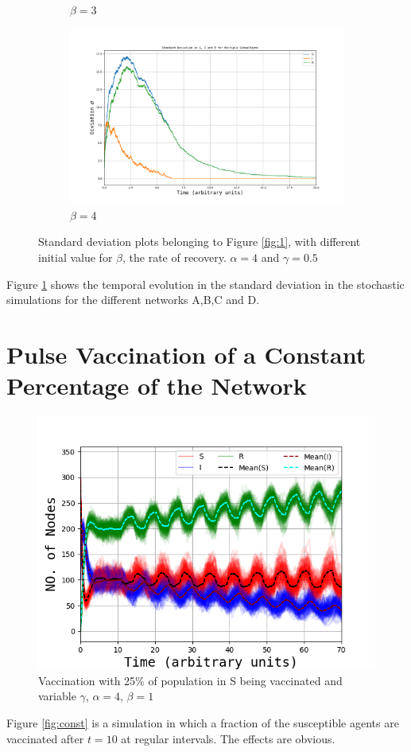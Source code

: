 \begin{figure}[H]
\begin{subfigure}{0.49\linewidth}
			\caption{$\beta = 3$}
		\end{subfigure}
		\begin{subfigure}{0.49\linewidth}
		    \includegraphics[width=1.1\linewidth]{Figures/StdDiv_OppgA_4_4_05.png}
			\caption{$\beta = 4$}
		\end{subfigure}
		\caption{Standard deviation plots belonging to Figure \ref{fig:1}, with different initial value for $\beta$, the rate of recovery. $\alpha = 4$ and $\gamma = 0.5$}
		\label{fig:StdDiv1}
	\end{figure}
	
Figure \ref{fig:StdDiv1} shows the temporal evolution in the standard deviation in the stochastic simulations for the different networks A,B,C and D. 
	
\section{Pulse Vaccination of a Constant Percentage of the Network}
\begin{figure}[H]
	\centering
		\includegraphics[width=\linewidth]{Figures/Vax_25perc_cvar_4_1_05.png}
		\caption{Vaccination with 25\% of population in S being vaccinated and variable $\gamma$, $\alpha = 4$, $\beta = 1$}
	\label{fig:const}
	\end{figure}
	
Figure \eqref{fig:const} is a simulation in which a fraction of the susceptible agents are vaccinated after $t = 10$ at regular intervals. The effects are obvious.